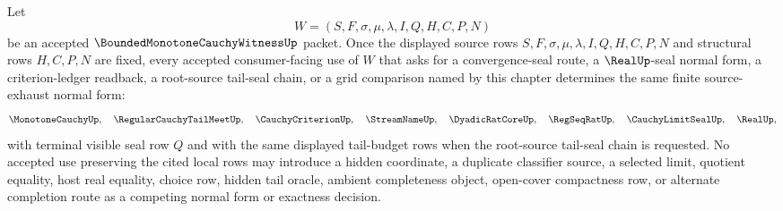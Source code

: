 \begin{corollary}
\label{cor:bounded-monotone-cauchy-witness-source-exhaust-determinacy}
Let
$$
W=(S,F,\sigma,\mu,\lambda,I,Q,H,C,P,N)
$$
be an accepted $\BoundedMonotoneCauchyWitnessUp$ packet. Once the displayed source rows $S,F,\sigma,\mu,\lambda,I,Q,H,C,P,N$ and structural rows $H,C,P,N$ are fixed, every accepted consumer-facing use of $W$ that asks for a convergence-seal route, a $\RealUp$-seal normal form, a criterion-ledger readback, a root-source tail-seal chain, or a grid comparison named by this chapter determines the same finite source-exhaust normal form:
$$
\MonotoneCauchyUp,\quad
\RegularCauchyTailMeetUp,\quad
\CauchyCriterionUp,\quad
\StreamNameUp,\quad
\DyadicRatCoreUp,\quad
\RegSeqRatUp,\quad
\CauchyLimitSealUp,\quad
\RealUp,
$$
with terminal visible seal row $Q$ and with the same displayed tail-budget rows when the root-source tail-seal chain is requested. No accepted use preserving the cited local rows may introduce a hidden coordinate, a duplicate classifier source, a selected limit, quotient equality, host real equality, choice row, hidden tail oracle, ambient completeness object, open-cover compactness row, or alternate completion route as a competing normal form or exactness decision.
\end{corollary}
